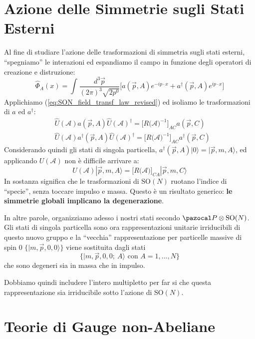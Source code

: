 \documentclass[../main.tex]{subfiles}
\begin{document}
\section{Azione delle Simmetrie sugli Stati Esterni}
Al fine di studiare l'azione delle trasformazioni di simmetria sugli stati esterni, “spegniamo” le interazioni ed espandiamo il campo in funzione degli operatori di creazione e distruzione:
\[
\hat{\Phi}_A(x) = \int_{}\frac{d^3\Vec{p}}{(2\pi)^3\sqrt{2p^0}}\big[ a(\Vec{p}, A)e^{-ip\cdot x} + a^\dagger(\Vec{p}, A)e^{ip\cdot x} \big]
\]
Applichiamo (\ref{eq:SON_field_transf_law_revised}) ed isoliamo le trasformazioni di $a$ ed $a^\dagger$:
\begin{equation}
    \boxed{
    \begin{aligned}
        &\hat{U}(\mathscr{A})a(\Vec{p}, A)\hat{U}(\mathscr{A})^\dagger=\Big[R\big(\mathscr{A}\big)^{-1}\Big]_{AC}a(\Vec{p}, C)\\
        &\hat{U}(\mathscr{A})a^\dagger(\Vec{p}, A)\hat{U}(\mathscr{A})^\dagger=\Big[R\big(\mathscr{A}\big)^{-1}\Big]_{AC}a^\dagger(\Vec{p}, C)
    \end{aligned}}
    \label{eq:SON_creat_annihil_transf}
\end{equation}
Considerando quindi gli stati di singola particella, $a^\dagger(\Vec{p}, A)|0\rangle = |\Vec{p}, m, A\rangle$, ed applicando $U(\mathscr{A})$ non è difficile arrivare a:
\begin{equation}
    \boxed{U(\mathscr{A})|\Vec{p}, m, A\rangle = \Big[R\big(\mathscr{A}\big)\Big]_{CA}|\Vec{p}, m, C\rangle}
    \label{eq:SON_action_ext_states}
\end{equation}
In sostanza significa che le trasformazioni di $\textrm{SO}(N)$ ruotano l'indice di “specie”, senza toccare impulso e massa.
Questo è un risultato generico: \textbf{le simmetrie globali implicano la degenerazione}. 

In altre parole, organizziamo adesso i nostri stati secondo $\pazocal P \otimes \textrm{SO}(N)$. Gli stati di singola particella sono ora rappresentazioni unitarie irriducibili di questo nuovo gruppo e la “vecchia” rappresentazione per particelle massive di spin 0 $\{|m,\Vec{p},0,0\rangle\}$ viene sostituita dagli stati
\[
\Big\{|m,\Vec{p},0,0;~A\rangle\text{ con } A =1,...,N\Big\}
\]
che sono degeneri sia in massa che in impulso.

Dobbiamo quindi includere l'intero multipletto per far si che questa rappresentazione sia irriducibile sotto l'azione di $\textrm{SO}(N)$.

\section{Teorie di Gauge non-Abeliane}
\end{document}
